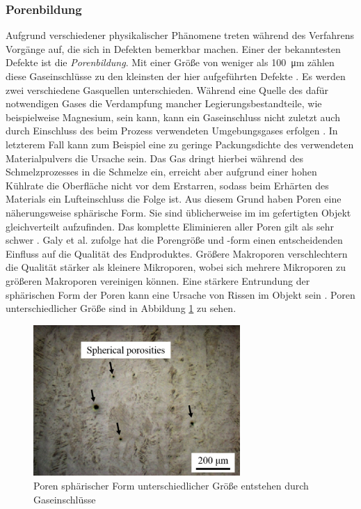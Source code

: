 		\subsubsection{Porenbildung}
		Aufgrund verschiedener physikalischer Phänomene treten während des Verfahrens Vorgänge auf,
		die sich in Defekten bemerkbar machen. Einer der bekanntesten Defekte ist die
		\emph{Porenbildung}. Mit einer Größe von weniger als \SI{100}{\micro\meter} zählen diese
		Gaseinschlüsse zu den kleinsten der hier aufgeführten Defekte \cite{zhang2017defect}. Es
		werden zwei verschiedene Gasquellen unterschieden. Während eine Quelle des dafür
		notwendigen Gases die Verdampfung mancher Legierungsbestandteile, wie beispielweise
		Magnesium, sein kann, kann ein Gaseinschluss nicht zuletzt auch durch Einschluss des beim
		Prozess verwendeten Umgebungsgases erfolgen \cite{galy2018main}. In letzterem Fall kann
		zum Beispiel eine zu geringe Packungsdichte des verwendeten Materialpulvers die Ursache
		sein. Das Gas dringt hierbei während des Schmelzprozesses in die Schmelze ein, erreicht
		aber aufgrund einer hohen Kühlrate die Oberfläche nicht vor dem Erstarren, sodass beim
		Erhärten des Materials ein Lufteinschluss die Folge ist. Aus diesem Grund haben Poren eine
		näherungsweise sphärische Form. Sie sind üblicherweise im im gefertigten Objekt
		gleichverteilt aufzufinden. Das komplette Eliminieren aller Poren gilt als sehr schwer
		\cite{zhang2017defect}. Galy et al. zufolge hat die Porengröße und -form einen
		entscheidenden Einfluss auf die Qualität des Endproduktes. Größere Makroporen
		verschlechtern die Qualität stärker als kleinere Mikroporen, wobei sich mehrere Mikroporen
		zu größeren Makroporen vereinigen können. Eine stärkere Entrundung der sphärischen Form
		der Poren kann eine Ursache von Rissen im Objekt sein \cite{galy2018main}. Poren
		unterschiedlicher Größe sind in Abbildung \ref{fig:defects_porosities} zu sehen.

		\begin{figure}[!ht]
			\centering
			\includegraphics[width=0.7\textwidth]{chapter/main/img/defects/porosities.png}
			\caption{Poren sphärischer Form unterschiedlicher Größe entstehen durch Gaseinschlüsse
			\cite{zhang2017defect}}
			\label{fig:defects_porosities}
		\end{figure}

